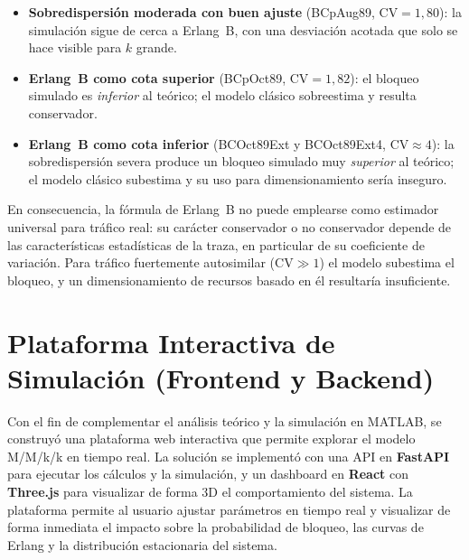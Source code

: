 \documentclass[12pt,a4paper]{article}
\theoremstyle{definition}
\theoremstyle{plain}
\theoremstyle{remark}
\begin{document}
\begin{itemize}
    \item \textbf{Sobredispersión moderada con buen ajuste} (BCpAug89,
          $\mathrm{CV}=1{,}80$): la simulación sigue de cerca a Erlang~B, con
          una desviación acotada que solo se hace visible para $k$ grande.

    \item \textbf{Erlang~B como cota superior} (BCpOct89, $\mathrm{CV}=1{,}82$):
          el bloqueo simulado es \emph{inferior} al teórico; el modelo clásico
          sobreestima y resulta conservador.

    \item \textbf{Erlang~B como cota inferior} (BCOct89Ext y BCOct89Ext4,
          $\mathrm{CV}\approx4$): la sobredispersión severa produce un bloqueo
          simulado muy \emph{superior} al teórico; el modelo clásico subestima
          y su uso para dimensionamiento sería inseguro.
\end{itemize}

En consecuencia, la fórmula de Erlang~B no puede emplearse como estimador
universal para tráfico real: su carácter conservador o no conservador depende
de las características estadísticas de la traza, en particular de su coeficiente
de variación. Para tráfico fuertemente autosimilar ($\mathrm{CV}\gg1$) el
modelo subestima el bloqueo, y un dimensionamiento de recursos basado en él
resultaría insuficiente.


\section*{Plataforma Interactiva de Simulación (Frontend y Backend)}

Con el fin de complementar el análisis teórico y la simulación en MATLAB, se construyó una
plataforma web interactiva que permite explorar el modelo M/M/k/k en tiempo real.
La solución se implementó con una API en \textbf{FastAPI} para ejecutar los cálculos y la
simulación, y un dashboard en \textbf{React} con \textbf{Three.js} para visualizar de forma
3D el comportamiento del sistema. La plataforma permite al usuario ajustar parámetros en
tiempo real y visualizar de forma inmediata el impacto sobre la probabilidad de bloqueo,
las curvas de Erlang y la distribución estacionaria del sistema.
\end{document}
